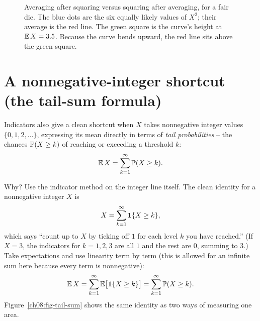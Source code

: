 \begin{figure}[H]
\centering
{}
\caption{Averaging after squaring versus squaring after averaging, for a fair
die. The blue dots are the six equally likely values of $X^2$; their average is
the red line. The green square is the curve's height at $\E X = 3.5$. Because
the curve bends upward, the red line sits above the green square.}
\label{ch08:fig-jensen-die}
\end{figure}

\section{A nonnegative-integer shortcut (the tail-sum formula)}
\label{ch08:tail-sum}

Indicators also give a clean shortcut when $X$ takes nonnegative integer values
$\{0, 1, 2, \dots\}$, expressing its mean directly in terms of \emph{tail
probabilities} -- the chances $\P(X \ge k)$ of reaching or exceeding a threshold $k$:
\[
  \E X = \sum_{k=1}^{\infty} \P(X \ge k).
\]

\begin{whybox}
Why? Use the indicator method on the integer line itself. The clean identity for
a nonnegative integer $X$ is
\[
  X = \sum_{k=1}^{\infty} \ind\{X \ge k\},
\]
which says ``count up to $X$ by ticking off $1$ for each level $k$ you have
reached.'' (If $X = 3$, the indicators for $k=1,2,3$ are all $1$ and the rest are
$0$, summing to $3$.) Take expectations and use linearity term by term (this is
allowed for an infinite sum here because every term is nonnegative):
\[
  \E X = \sum_{k=1}^\infty \E\bigl[\ind\{X\ge k\}\bigr] = \sum_{k=1}^\infty \P(X \ge k).
\]
Figure~\ref{ch08:fig-tail-sum} shows the same identity as two ways of
measuring one area.
\end{whybox}

